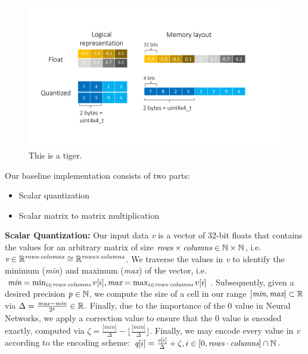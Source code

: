 \begin{figure}
\centering
  \includegraphics[scale=0.3]{figures/uint4x4_t.pdf}
  \caption{\vspace*{-0.4cm}This is a tiger.}
\end{figure}

Our baseline implementation consists of two parts:
\begin{itemize}
\item Scalar quantization
\item Scalar matrix to matrix multiplication
\end{itemize}

\textbf{Scalar Quantization: } Our input data \emph{v} is a vector of 32-bit floats that contains the values for an arbitrary matrix of size $\emph{rows} \times \emph{columns} \in \mathbb{N} \times \mathbb{N} $, i.e.\ $ \emph{v} \in \mathbb{R}^{ \emph{rows} \cdot \emph{columns} } \cong \mathbb{R}^{ \emph{rows} \times \emph{columns} } $. We traverse the values in \emph{v} to identify the minimum (\emph{min}) and maximum (\emph{max}) of the vector, i.e. $ \emph{min} = \min_{ i \in \emph{rows} \cdot \emph{columns} } v[i] , \emph{max} = \max_{i \in \emph{rows} \cdot \emph{columns} } v[i] $. Subsequently, given a desired precision $ \emph{p} \in \mathbb{N} $, we compute the size of a cell in our range $[\emph{min},\emph{max}] \subset \mathbb{R}$ via $ \Delta = \frac{ \emph{max} - \emph{min} }{ 2^{\emph{p}}} \in \mathbb{R} $. Finally, due to the importance of the 0 value in Neural Networks, we apply a correction value to ensure that the 0 value is encoded exactly, computed via $ \zeta = \frac{ | min | }{ \Delta } - \lfloor \frac{ | min | }{ \Delta } \rfloor $. Finally, we may encode every value in \emph{v} according to the encoding scheme: $ \emph{q}[i] = \frac{ \emph{v}[i] } {\Delta} + \zeta , i \in [0, \emph{rows}\cdot\emph{columns}] \cap \mathbb{N} $.

